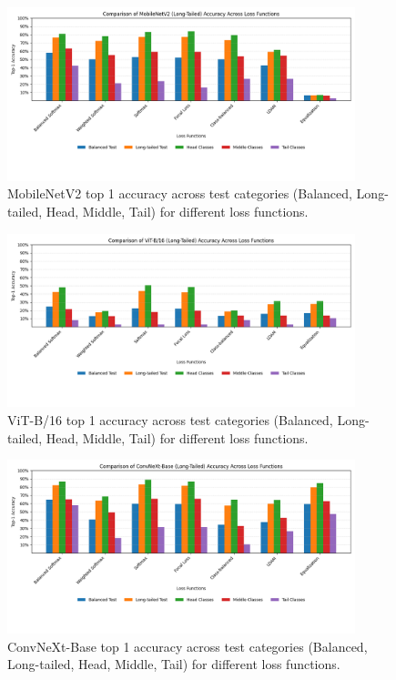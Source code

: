 \begin{figure}[h!]
    \centering
    \includegraphics[width=0.9\textwidth]{Images/Plots/mobilenet_lt_loss_comparison.png}
    \caption{MobileNetV2 top 1 accuracy across test categories (Balanced, Long-tailed, Head, Middle, Tail) for different loss functions.}
    \label{fig:mobilenet_lt_loss_comparison}
\end{figure}
\FloatBarrier

\begin{figure}[h!]
    \centering
    \includegraphics[width=0.9\textwidth]{Images/Plots/vit_lt_loss_comparison.png}
    \caption{ViT-B/16 top 1 accuracy across test categories (Balanced, Long-tailed, Head, Middle, Tail) for different loss functions.}
    \label{fig:vit_lt_loss_comparison}
\end{figure}
\FloatBarrier

\begin{figure}[h!]
    \centering
    \includegraphics[width=0.9\textwidth]{Images/Plots/convnext_lt_loss_comparison.png}
    \caption{ConvNeXt-Base top 1 accuracy across test categories (Balanced, Long-tailed, Head, Middle, Tail) for different loss functions.}
    \label{fig:conv_lt_loss_comparison}
\end{figure}
\FloatBarrier


